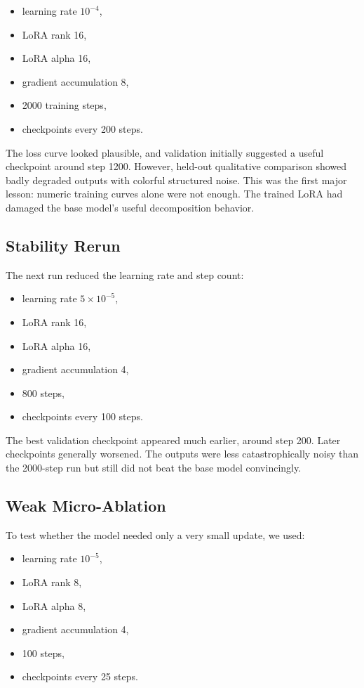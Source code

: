 \documentclass[11pt]{article}
\begin{document}
\begin{itemize}[leftmargin=*]
    \item learning rate $10^{-4}$,
    \item LoRA rank 16,
    \item LoRA alpha 16,
    \item gradient accumulation 8,
    \item 2000 training steps,
    \item checkpoints every 200 steps.
\end{itemize}

The loss curve looked plausible, and validation initially suggested a useful
checkpoint around step 1200. However, held-out qualitative comparison showed badly
degraded outputs with colorful structured noise. This was the first major lesson:
numeric training curves alone were not enough. The trained LoRA had damaged the
base model's useful decomposition behavior.

\subsection{Stability Rerun}

The next run reduced the learning rate and step count:

\begin{itemize}[leftmargin=*]
    \item learning rate $5\times10^{-5}$,
    \item LoRA rank 16,
    \item LoRA alpha 16,
    \item gradient accumulation 4,
    \item 800 steps,
    \item checkpoints every 100 steps.
\end{itemize}

The best validation checkpoint appeared much earlier, around step 200. Later
checkpoints generally worsened. The outputs were less catastrophically noisy than
the 2000-step run but still did not beat the base model convincingly.

\subsection{Weak Micro-Ablation}

To test whether the model needed only a very small update, we used:

\begin{itemize}[leftmargin=*]
    \item learning rate $10^{-5}$,
    \item LoRA rank 8,
    \item LoRA alpha 8,
    \item gradient accumulation 4,
    \item 100 steps,
    \item checkpoints every 25 steps.
\end{itemize}
\end{document}
